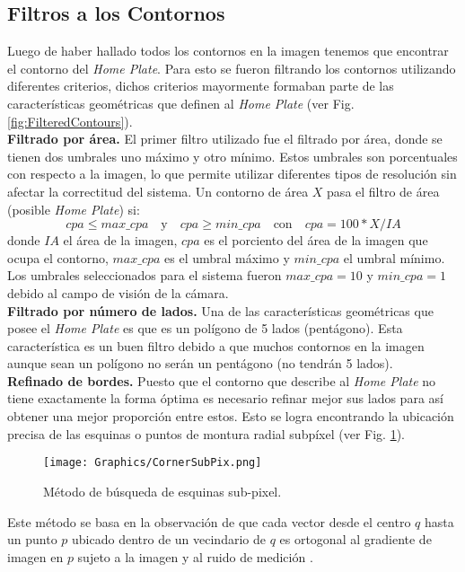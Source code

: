 \subsection{Filtros a los Contornos}

Luego de haber hallado todos los contornos en la imagen tenemos que encontrar el contorno del \textit{Home Plate}. Para esto se fueron filtrando los contornos utilizando diferentes criterios, dichos criterios mayormente formaban parte de las características geométricas que definen al \textit{Home Plate} (ver Fig. \ref{fig:FilteredContours}). \\

\textbf{Filtrado por área.}
El primer filtro utilizado fue el filtrado por área, donde se tienen dos umbrales uno máximo y otro mínimo. Estos umbrales son porcentuales con respecto a la imagen, lo que permite utilizar diferentes tipos de resolución sin afectar la correctitud del sistema. Un contorno de área $X$ pasa el filtro de área (posible \textit{Home Plate}) si:
$$cpa \leq max\_cpa \quad \text{y} \quad cpa \geq min\_cpa \quad \text{con} \quad cpa = 100 * X / IA$$
donde $IA$ el área de la imagen, $cpa$ es el porciento del área de la imagen que ocupa el contorno, $max\_cpa$ es el umbral máximo y $min\_cpa$ el umbral mínimo. Los umbrales seleccionados para el sistema fueron $max\_cpa = 10$ y $min\_cpa = 1$ debido al campo de visión de la cámara.\\

\textbf{Filtrado por número de lados.}
Una de las características geométricas que posee el \textit{Home Plate} es que es un polígono de 5 lados (pentágono). Esta característica es un buen filtro debido a que muchos contornos en la imagen aunque sean un polígono no serán un pentágono (no tendrán 5 lados).\\

\textbf{Refinado de bordes.}
Puesto que el contorno que describe al \textit{Home Plate} no tiene exactamente la forma óptima es necesario refinar mejor sus lados para así obtener una mejor proporción entre estos. Esto se logra encontrando la ubicación precisa de las esquinas o puntos de montura radial subpíxel (ver Fig. \ref{fig:CornerSubPix}).

\begin{figure}[h!]
	\centering
	\texttt{[image: Graphics/CornerSubPix.png]}
	\caption{Método de búsqueda de esquinas sub-pixel.}
	\label{fig:CornerSubPix}
\end{figure}

Este método se basa en la observación de que cada vector desde el centro $q$ hasta un punto $p$ ubicado dentro de un vecindario de $q$ es ortogonal al gradiente de imagen en $p$ sujeto a la imagen y al ruido de medición \cite{CornerSubPixOpenCV}.\\

